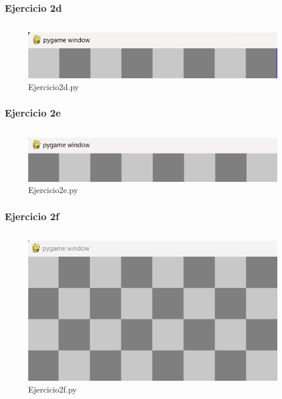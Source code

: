 \documentclass{article}
\newenvironment{block}{\captionsetup{type=listing}}{}
\begin{document}
\subsubsection{Ejercicio 2d}
\begin{block}
	\inputminted{python}{../Tarea-del-Ajedrez/Ejercicio2d.py}
	\begin{figure}[H]
		\centering
		\includegraphics[height=0.1\textwidth]{img/2d.png}
		\caption{Ejercicio2d.py}
	\end{figure}
\end{block}
\subsubsection{Ejercicio 2e}
\begin{block}
	\inputminted{python}{../Tarea-del-Ajedrez/Ejercicio2e.py}
	\begin{figure}[H]
		\centering
		\includegraphics[height=0.1\textwidth]{img/2e.png}
		\caption{Ejercicio2e.py}
	\end{figure}
\end{block}
\subsubsection{Ejercicio 2f}
\begin{block}
	\inputminted{python}{../Tarea-del-Ajedrez/Ejercicio2f.py}
	\begin{figure}[H]
		\centering
		\includegraphics[height=0.5\textwidth]{img/2f.png}
		\caption{Ejercicio2f.py}
	\end{figure}
\end{block}
\end{document}
